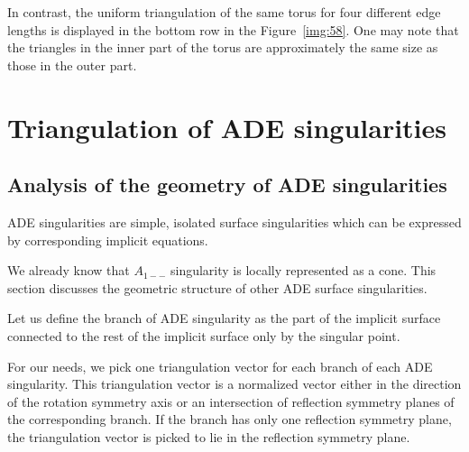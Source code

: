 In contrast, the uniform triangulation of the same torus for four different edge lengths
is displayed in the bottom row in the Figure~\ref{img:58}. One may note that the 
triangles in the inner part of the torus are approximately the same 
size as those in the outer part.

\section{Triangulation of ADE singularities}
\label{sub3.2}

\subsection{Analysis of the geometry of ADE singularities}

ADE singularities are simple, isolated surface singularities which can be
expressed by corresponding implicit equations.

We already know that $A_{1--}$ singularity is locally represented as a cone.
This section discusses the geometric structure of other ADE surface singularities.

\begin{definition}
    Let us define the branch of ADE singularity as the part of the implicit surface
    connected to the rest of the implicit surface only by the singular point.
\end{definition}

For our needs, we pick one triangulation vector for each branch of
each ADE singularity. This triangulation vector is a normalized vector
either in the direction
of the rotation symmetry axis or an intersection of reflection symmetry planes
of the corresponding branch. If the branch has only one reflection symmetry
plane, the triangulation vector is picked to lie in the reflection
symmetry plane.

